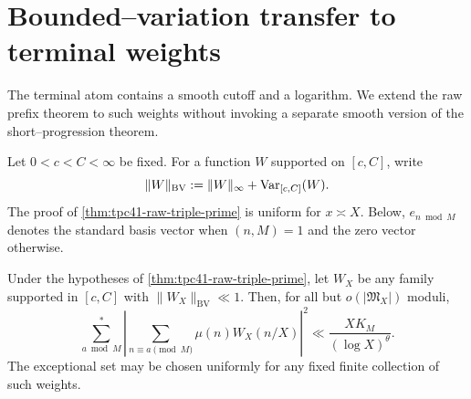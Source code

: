 \section{Bounded--variation transfer to terminal weights}
\label{sec:tpc41-weighted}

The terminal atom contains a smooth cutoff and a logarithm.  We extend the
raw prefix theorem to such weights without invoking a separate smooth
version of the short--progression theorem.

Let \(0<c<C<\infty\) be fixed.  For a function \(W\) supported on
\([c,C]\), write
\begin{equation}
 \|W\|_{\mathrm{BV}}
 :=\|W\|_\infty+\operatorname{Var}_{[c,C]}(W).
 \label{eq:tpc41-BV-norm}
\end{equation}
The proof of \cref{thm:tpc41-raw-triple-prime} is uniform for
\(x\asymp X\).  Below, \(e_{n\bmod M}\) denotes the standard basis vector
when \((n,M)=1\) and the zero vector otherwise.

\begin{theorem}
\label{thm:tpc41-weighted-raw}
Under the hypotheses of \cref{thm:tpc41-raw-triple-prime}, let
\(W_X\) be any family supported in \([c,C]\) with
\(\|W_X\|_{\mathrm{BV}}\ll1\).  Then, for all but
\(o(|\mathfrak M_X|)\) moduli,
\begin{equation}
 \boxed{
 \sum_{a\bmod M}^{*}
 \left|
  \sum_{n\equiv a\pmod M}\mu(n)W_X(n/X)
 \right|^2
 \ll\frac{XK_M}{(\log X)^\theta}.}
 \label{eq:tpc41-weighted-raw}
\end{equation}
The exceptional set may be chosen uniformly for any fixed finite
collection of such weights.
\end{theorem}

